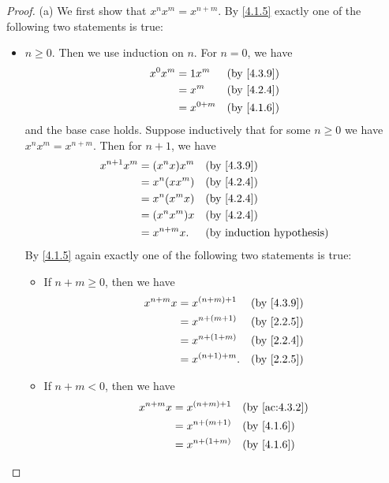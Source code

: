 \begin{proof}{(a)}
	We first show that \(x^n x^m = x^{n + m}\).
	By \cref{4.1.5} exactly one of the following two statements is true:
	\begin{itemize}
		\item \(n \geq 0\).
		      Then we use induction on \(n\).
		      For \(n = 0\), we have
		      \begin{align*}
			      x^0 x^m & = 1x^m      &  & \by{4.3.9} \\
			              & = x^m       &  & \by{4.2.4} \\
			              & = x^{0 + m} &  & \by{4.1.6}
		      \end{align*}
		      and the base case holds.
		      Suppose inductively that for some \(n \geq 0\) we have \(x^n x^m = x^{n + m}\).
		      Then for \(n + 1\), we have
		      \begin{align*}
			      x^{n + 1} x^m & = (x^n x) x^m  &  & \by{4.3.9} \\
			                    & = x^n (x x^m)  &  & \by{4.2.4} \\
			                    & = x^n (x^m x)  &  & \by{4.2.4} \\
			                    & = (x^n x^m) x  &  & \by{4.2.4} \\
			                    & = x^{n + m} x. &  & \byIH
		      \end{align*}
		      By \cref{4.1.5} again exactly one of the following two statements is true:
		      \begin{itemize}
			      \item If \(n + m \geq 0\), then we have
			            \begin{align*}
				            x^{n + m} x & = x^{(n + m) + 1}  &  & \by{4.3.9} \\
				                        & = x^{n + (m + 1)}  &  & \by{2.2.5} \\
				                        & = x^{n + (1 + m)}  &  & \by{2.2.4} \\
				                        & = x^{(n + 1) + m}. &  & \by{2.2.5}
			            \end{align*}
			      \item If \(n + m < 0\), then we have
			            \begin{align*}
				            x^{n + m} x & = x^{(n + m) + 1}  &  & \by{ac:4.3.2} \\
				                        & = x^{n + (m + 1)}  &  & \by{4.1.6}    \\
				                        & = x^{n + (1 + m)}  &  & \by{4.1.6}    \\

\end{align*}
\end{itemize}
\end{itemize}
\end{proof}
